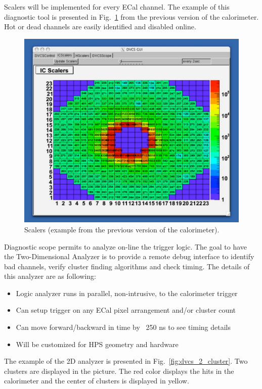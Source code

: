 Scalers will be implemented for every ECal channel. The example of this diagnostic tool is presented in Fig.~\ref{fig:dvcs_beam}
from the previous version of the calorimeter. Hot or dead channels are easily identified and disabled online.
\begin{figure}[h]
\includegraphics[scale=0.52]{daq_trigger/figures/dvcs_beam}
\caption{\small{Scalers (example from the previous version of the calorimeter).}}
\label{fig:dvcs_beam}
\end{figure}
Diagnostic scope permits to analyze on-line  the trigger logic. The goal to have  the Two-Dimensional Analyzer
 is to provide a remote debug interface to identify bad channels, verify cluster finding algorithms and check timing.
 The details of this analyzer are as following:
 
\begin{itemize}
\item Logic analyzer runs in parallel, non-intrusive, to the calorimeter trigger
\item Can setup trigger on any ECal pixel arrangement and/or cluster count
\item Can move forward/backward in time by ~250 ns to see timing details
\item Will be customized for HPS geometry and hardware
\end{itemize}

The example of the 2D analyzer is presented in Fig.~\ref{fig:dvcs_2_cluster}. Two clusters are displayed
in the picture. The red color displays the hits in the calorimeter and  the center of clusters is displayed in yellow.

